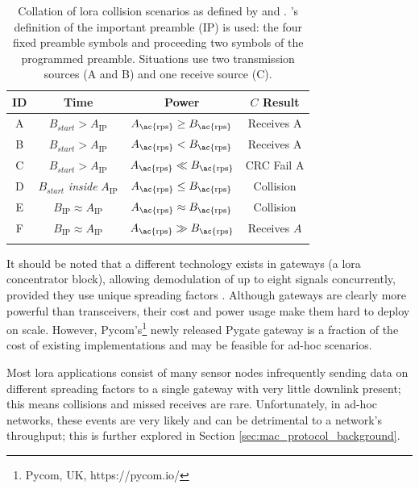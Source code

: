 \begin{table}[H]
\centering\small
\caption[\ac{lora} collision scenarios]{Collation of \ac{lora} collision scenarios as defined by \cite{3YP:LORA_FOR_IOT} and \cite{3YP:LORA_COLLISIONS}. \cite{3YP:LORA_COLLISIONS}'s definition of the important preamble (IP) is used: the four fixed preamble symbols and proceeding two symbols of the programmed preamble. Situations use two transmission sources (A and B) and one receive source (C).}
\begin{tabular}{c|cc|c}
    \toprule
    \textbf{ID} & \textbf{Time} & \textbf{Power} & \textbf{$C$ Result}\\
    \midrule\addlinespace
    A & $B_{start} > A_{\text{IP}}$ & $A_{\text{\ac{rps}}} \geq B_{\text{\ac{rps}}}$ & Receives A \\
    B & $B_{start} > A_{\text{IP}}$ & $A_{\text{\ac{rps}}} < B_{\text{\ac{rps}}}$ &  Receives A \\
    C & $B_{start} > A_{\text{IP}}$ & $A_{\text{\ac{rps}}} \ll B_{\text{\ac{rps}}}$ & CRC Fail A \\
    D & $B_{start}$ \textit{inside} $A_{\text{IP}}$ & $A_{\text{\ac{rps}}} \leq B_{\text{\ac{rps}}}$ & Collision \\
    E & $B_{\text{IP}} \approx A_{\text{IP}}$ & $A_{\text{\ac{rps}}} \approx B_{\text{\ac{rps}}}$ & Collision \\
    F & $B_{\text{IP}} \approx A_{\text{IP}}$ & $A_{\text{\ac{rps}}} \gg B_{\text{\ac{rps}}}$ & Receives $A$ \\
    \addlinespace\bottomrule
\end{tabular}
\label{tab:collisions}
\end{table}

 It should be noted that a different technology exists in gateways (a \ac{lora} concentrator block), allowing demodulation of up to eight signals concurrently, provided they use unique spreading factors \cite{3YP:LORA_SX1301}. Although gateways are clearly more powerful than transceivers, their cost and power usage make them hard to deploy on scale. However, Pycom's\footnote{Pycom, UK,  https://pycom.io/} newly released Pygate gateway is a fraction of the cost of existing implementations and may be feasible for ad-hoc scenarios.

 Most \ac{lora} applications consist of many sensor nodes infrequently sending data on different spreading factors to a single gateway with very little downlink present; this means collisions and missed receives are rare. Unfortunately, in ad-hoc networks, these events are very likely and can be detrimental to a network's throughput; this is further explored in Section \ref{sec:mac_protocol_background}.
\newpage
